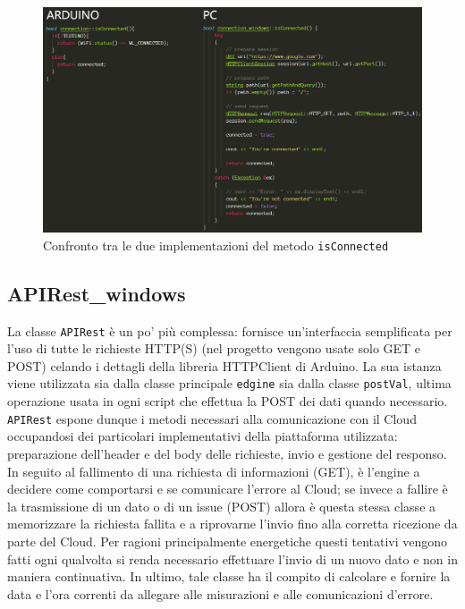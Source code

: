\begin{figure}[H]
	\centering
	\includegraphics[width=\linewidth]{pics/connAW}
	\caption{Confronto tra le due implementazioni del metodo \texttt{isConnected}}
	\label{connAW}
\end{figure}

\subsection{APIRest\_windows}
La classe \texttt{APIRest} è un po' più complessa: fornisce un'interfaccia semplificata per l'uso di tutte le richieste HTTP(S) (nel progetto vengono usate solo GET e POST) celando i dettagli della libreria HTTPClient di Arduino. La sua istanza viene utilizzata sia dalla classe principale \texttt{edgine} sia dalla classe \texttt{postVal}, ultima operazione usata in ogni script che effettua la POST dei dati quando necessario. \texttt{APIRest} espone dunque i metodi necessari alla comunicazione con il Cloud occupandosi dei particolari implementativi della piattaforma utilizzata: preparazione dell'header e del body delle richieste, invio e gestione del responso. In seguito al fallimento di una richiesta di informazioni (GET), è l'engine a decidere come comportarsi e se comunicare l'errore al Cloud; se invece a fallire è la trasmissione di un dato o di un issue (POST) allora è questa stessa classe a memorizzare la richiesta fallita e a riprovarne l'invio fino alla corretta ricezione da parte del Cloud. Per ragioni principalmente energetiche questi tentativi vengono fatti ogni qualvolta si renda necessario effettuare l'invio di un nuovo dato e non in maniera continuativa. In ultimo, tale classe ha il compito di calcolare e fornire la data e l'ora correnti da allegare alle misurazioni e alle comunicazioni d'errore.

